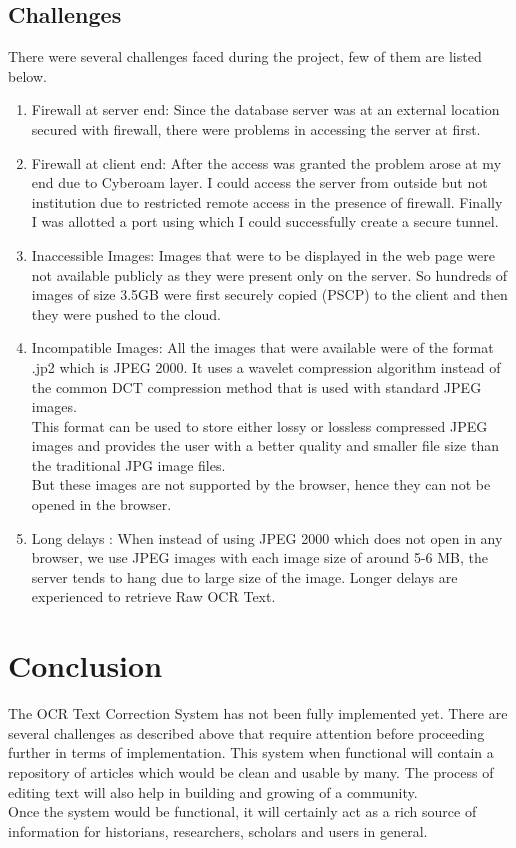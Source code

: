 \documentclass[amsart, 12pt]{article}
\begin{document}
\subsection{Challenges}
There were several challenges faced during the project, few of them are listed below.
\begin{enumerate}
\item Firewall at server end: Since the database server was at an external location secured with firewall, there were problems in accessing the server at first.
\item Firewall at client end: After the access was granted the problem arose at my end due to Cyberoam layer. I could access the server from outside but not institution due to restricted remote access in the presence of firewall. Finally I was allotted a port using which I could successfully create a secure tunnel.
\item Inaccessible Images: Images that were to be displayed in the web page were not available publicly as they were present only on the server. So hundreds of images of size 3.5GB were first securely copied (PSCP) to the client and then they were pushed to the cloud.
\item Incompatible Images: All the images that were available were of the format .jp2 which is JPEG 2000. It uses a wavelet compression algorithm instead of the common DCT compression method that is used with standard JPEG images.\\
This format can be used to store either lossy or lossless compressed JPEG images and provides the user with a better quality and smaller file size than the traditional JPG image files.\\
But these images are not supported by the browser, hence they can not be opened in the browser.
\item Long delays : When instead of using JPEG 2000 which does not open in any browser, we use JPEG images with each image size of around 5-6 MB, the server tends to hang due to large size of the image. Longer delays are experienced to retrieve Raw OCR Text.
\end{enumerate}

\section{Conclusion}
The OCR \cite{OCR} Text Correction System has not been fully implemented yet. There are several challenges as described above that require attention before proceeding further in terms of implementation. This system when functional will contain a repository of articles which would be clean and usable by many. The process of editing text will also help in building and growing of a community.\\
Once the system would be functional, it will certainly act as a rich source of information for historians, researchers, scholars and users in general.\\
\end{document}
